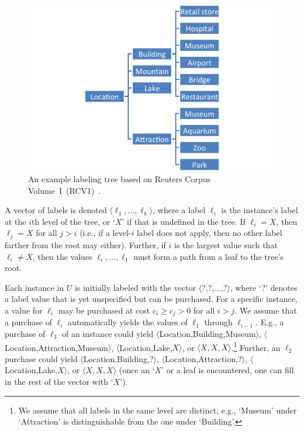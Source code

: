 \documentclass[10pt, conference, compsocconf]{IEEEtran}
\begin{document}
\begin{figure}[ht]
\vskip 0.2in
\begin{center}
\centerline{\includegraphics[width=1.1 \columnwidth]{fig/exp-ontology.png}}
\caption{An example labeling tree based on Reuters Corpus Volume~I~(RCV1)~\cite{Lewis2004}. 
}
\label{fig:ontologyex}
\end{center}
\vskip -0.2in
\end{figure} 

A vector of labels is denoted $\langle \ell_1,\ldots,\ell_k \rangle$, where a
label $\ell_i$ is the instance's label at the $i$th level of the tree, or `$X$' if that is
undefined in the tree.  If $\ell_i=X$, then $\ell_j=X$ for all $j > i$ (i.e., if a level-$i$
label does not apply, then no other label farther from the root may either).
Further, if $i$ is the largest value such that $\ell_i \neq X$, then
the values $\ell_i,\ldots,\ell_1$ must form a path from a leaf to the tree's root. 

Each instance in $U$ is initially labeled with the vector
$\langle$?,?,$\ldots$,?$\rangle$,
where `?' denotes a label value that is yet unspecified but can
be purchased.  For a specific instance, a value for $\ell_i$ may be purchased 
at cost $c_i \ge c_j > 0$ for all $i > j$.  We assume that a purchase of $\ell_i$ automatically
yields the values of $\ell_1$ through $\ell_{i-1}$.  E.g., a purchase of $\ell_3$ of an
instance could yield
$\langle$Location,Building,Museum$\rangle$,  $\langle$Location,Attraction,Museum$\rangle$,
$\langle$Location,Lake,$X\rangle$, or $\langle X,X,X \rangle$.\footnote{We assume that all labels in the
same level are distinct, e.g., `Museum' under `Attraction' is distinguishable from the one under
`Building'.}  %
Further, an $\ell_2$ purchase could yield
$\langle$Location,Building,?$\rangle$,  $\langle$Location,Attraction,?$\rangle$,
$\langle$Location,Lake,$X\rangle$, or $\langle X,X,X \rangle$ (once an `$X$' or a leaf
is encountered, one can fill in the rest of the vector with `$X$').
\end{document}
